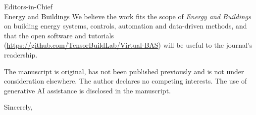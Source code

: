 \documentclass[11pt]{letter}
\begin{document}
\begin{letter}{Editors-in-Chief\\Energy and Buildings}
We believe the work fits the scope of \emph{Energy and Buildings} on building energy systems, controls, automation and
data-driven methods, and that the open software and tutorials
(\url{https://github.com/TensorBuildLab/Virtual-BAS}) will be useful to the journal's readership.

The manuscript is original, has not been published previously and is not under consideration elsewhere. The author
declares no competing interests. The use of generative AI assistance is disclosed in the manuscript.

\closing{Sincerely,}
\end{letter}
\end{document}
